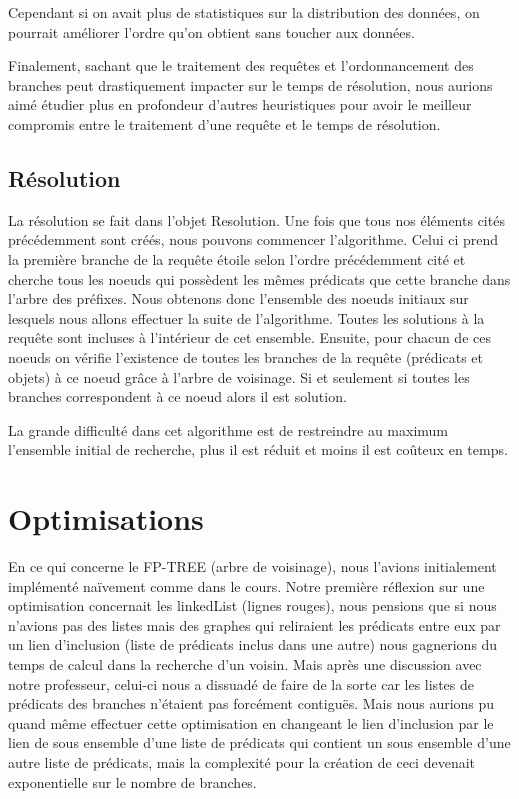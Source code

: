 \documentclass[12pt]{report}
\begin{document}
Cependant si on avait plus de statistiques sur la distribution des données, on pourrait améliorer l'ordre qu'on obtient sans toucher aux données.

Finalement, sachant que le traitement des requêtes et l'ordonnancement des branches peut drastiquement impacter sur le temps de résolution, nous aurions aimé étudier plus en profondeur d'autres heuristiques pour avoir le meilleur compromis entre le traitement d'une requête et le temps de résolution.

\subsection{Résolution}

La résolution se fait dans l'objet Resolution.
Une fois que tous nos éléments cités précédemment sont créés, nous pouvons commencer l'algorithme. Celui ci prend la première branche de la requête étoile selon l'ordre précédemment cité et cherche tous les noeuds qui possèdent les mêmes prédicats que cette branche dans l'arbre des préfixes. Nous obtenons donc l'ensemble des noeuds initiaux sur lesquels nous allons effectuer la suite de l'algorithme. Toutes les solutions à la requête sont incluses à l'intérieur de cet ensemble. Ensuite, pour chacun de ces noeuds on vérifie l'existence de toutes les branches de la requête (prédicats et objets) à ce noeud grâce à l'arbre de voisinage. Si et seulement si toutes les branches correspondent à ce noeud alors il est solution.

La grande difficulté dans cet algorithme est de restreindre au maximum l'ensemble initial de recherche, plus il est réduit et moins il est coûteux en temps.

\section{Optimisations}

En ce qui concerne le FP-TREE (arbre de voisinage), nous l'avions initialement implémenté naïvement comme dans le cours. Notre première réflexion sur une optimisation concernait les linkedList (lignes rouges), nous pensions que si nous n'avions pas des listes mais des graphes qui reliraient les prédicats entre eux par un lien d'inclusion (liste de prédicats inclus dans une autre) nous gagnerions du temps de calcul dans la recherche d'un voisin. Mais après une discussion avec notre professeur, celui-ci nous a dissuadé de faire de la sorte car les listes de prédicats des branches n'étaient pas forcément contiguës. Mais nous aurions pu quand même effectuer cette optimisation en changeant le lien d'inclusion par le lien de sous ensemble d'une liste de prédicats qui contient un sous ensemble d'une autre liste de prédicats, mais la complexité pour la création de ceci devenait exponentielle sur le nombre de branches.
\end{document}
